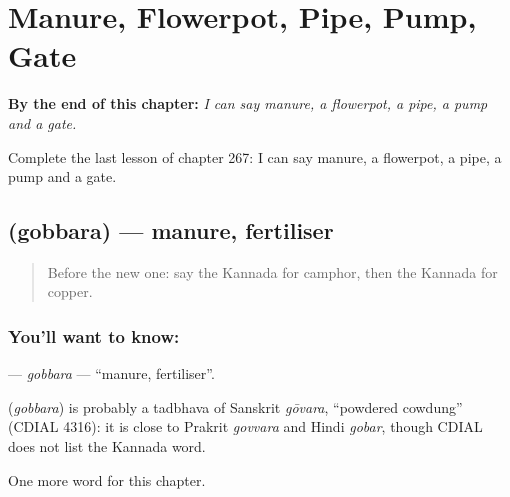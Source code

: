 
\chapter{Manure, Flowerpot, Pipe, Pump, Gate}
\label{ch:ka-manure-flowerpot-pipe-pump-gate}

\begin{chapteropening}
\textbf{By the end of this chapter:} \emph{I can say manure, a flowerpot, a pipe, a pump and a gate.}

Complete the last lesson of chapter 267: I can say manure, a flowerpot, a pipe, a pump and a gate.
\end{chapteropening}

\section[\texorpdfstring{\kn{ಗೊಬ್ಬರ} (gobbara)}{ಗೊಬ್ಬರ (gobbara)}]{ (gobbara) — manure, fertiliser}

\label{lesson:KA-C267-gobbara}



\begin{quote}
Before the new one: say the Kannada for camphor, then the Kannada for copper.
\end{quote}

\subsection*{You'll want to know: }
\textbf{} — \emph{gobbara} — \textquotedblleft{}manure, fertiliser\textquotedblright{}.

\begin{cousinweb}
\textbf{} (\emph{gobbara}) is probably a tadbhava of Sanskrit \emph{gōvara}, \textquotedblleft{}powdered cowdung\textquotedblright{} (CDIAL 4316): it is close to Prakrit \emph{govvara} and Hindi \emph{gobar}, though CDIAL does not list the Kannada word.
\end{cousinweb}

\begin{grammarlens}[title={What you've built}]
One more word for this chapter.
\end{grammarlens}

